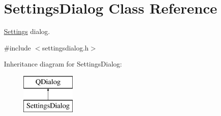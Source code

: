 \hypertarget{class_settings_dialog}{\section{Settings\-Dialog Class Reference}
\label{class_settings_dialog}
}


\hyperlink{class_settings}{Settings} dialog.  




{\ttfamily \#include $<$settingsdialog.\-h$>$}

Inheritance diagram for Settings\-Dialog\-:\begin{figure}[H]
\begin{center}
\leavevmode
\includegraphics[height=2.000000cm]{class_settings_dialog}
\end{center}
\end{figure}
